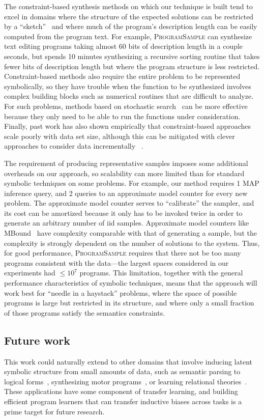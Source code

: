 \documentclass{article}
\newcommand{\theSystem}{\textsc{ProgramSample}}
\begin{document}
The constraint-based synthesis methods on which our technique is built tend to excel in domains where the structure of the expected solutions can be restricted by a ``sketch''~\cite{solar2008program} and where much of the program's description length can be easily computed from the program text. 
For example, \theSystem{} can synthesize text editing programs taking almost 60 bits of description length in a couple seconds, but spends 10 minutes synthesizing a recursive sorting routine that takes fewer bits of description length but where the program structure is less restricted. 
Constraint-based methods also require the entire problem to be represented symbolically, so they have trouble when the function to be synthesized involves complex building blocks such as numerical routines that are difficult to analyze.
For such problems, methods based on stochastic search~\cite{nori2015efficient,schkufza2013stochastic,DBLP:books/daglib/0070933} can be more effective because they only need to be able to run the functions under consideration. Finally, past work has also shown empirically that constraint-based approaches scale poorly with data set size, although this can be mitigated with clever approaches to consider data incrementally ~\cite{ellis2015unsupervised,raychev2016learning}.


The requirement of producing representative samples imposes some additional overheads on our approach, so scalability can  more limited than for standard symbolic techniques on some problems. For example, our method requires 1 MAP inference query, and 2 queries to an approximate model counter for every new problem. The approximate model counter serves to ``calibrate'' the sampler, and its cost can be amortized because it only has to be invoked twice in order to generate an arbitrary number of iid samples. Approximate model counters like MBound~\cite{gomes2006model}
have complexity comparable with that of generating a sample, but the complexity is strongly dependent on the number of solutions to the system. 
Thus, for good performance, \theSystem{} requires that there not be too many programs consistent with the data---the largest spaces considered in our experiments had  $\leq 10^7$ programs. This limitation, together with the general performance characteristics of symbolic techniques, means that the approach will work best for ``needle in a haystack'' problems, where the space of possible programs is large but restricted in its structure, and where only a small fraction of those programs satisfy the semantics constraints.


\subsection{Future work}
This work could naturally extend to other domains that involve inducing latent symbolic structure from small amounts of data,
such as semantic parsing to logical forms~\cite{liang11dcs},
synthesizing motor programs~\cite{lake2015human},
or learning relational theories~\cite{logical}.
These applications have some component of transfer learning,
and building efficient program learners that can transfer inductive biases across tasks is a prime target for future research.
\pagebreak


\end{document}

